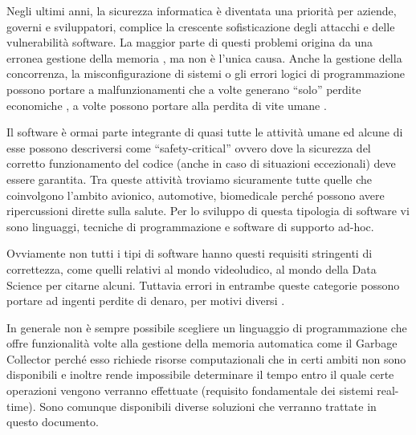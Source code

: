 Negli ultimi anni, la sicurezza informatica è diventata una priorità per aziende, governi e sviluppatori, complice la crescente sofisticazione degli attacchi e delle vulnerabilità software. La maggior parte di questi problemi origina da una erronea gestione della memoria \cite{MemoryProblems}, ma non è l'unica causa. Anche la gestione della concorrenza, la misconfigurazione di sistemi o gli errori logici di programmazione possono portare a malfunzionamenti che a volte generano ``solo'' perdite economiche \cite{WikiCrowdStrike}, a volte possono portare alla perdita di vite umane \cite{Therac-25}.


Il software è ormai parte integrante di quasi tutte le attività umane ed alcune di esse possono descriversi come ``safety-critical'' ovvero dove la sicurezza del corretto funzionamento del codice (anche in caso di situazioni eccezionali) deve essere garantita. Tra queste attività troviamo sicuramente tutte quelle che coinvolgono l'ambito avionico, automotive, biomedicale perché possono avere ripercussioni dirette sulla salute. Per lo sviluppo di questa tipologia di software vi sono linguaggi, tecniche di programmazione e software di supporto ad-hoc.


Ovviamente non tutti i tipi di software hanno questi requisiti stringenti di correttezza, come quelli relativi al mondo videoludico, al mondo della Data Science per citarne alcuni. Tuttavia errori in entrambe queste categorie possono portare ad ingenti perdite di denaro, per motivi diversi \cite{NintendoLooseMoney} \cite{LondonWhale}. 


In generale non è sempre possibile scegliere un linguaggio di programmazione che offre funzionalità volte alla gestione della memoria automatica come il Garbage Collector perché esso richiede risorse computazionali che in certi ambiti non sono disponibili e inoltre rende impossibile determinare il tempo entro il quale certe operazioni vengono verranno effettuate (requisito fondamentale dei sistemi real-time). Sono comunque disponibili diverse soluzioni che verranno trattate in questo documento.



